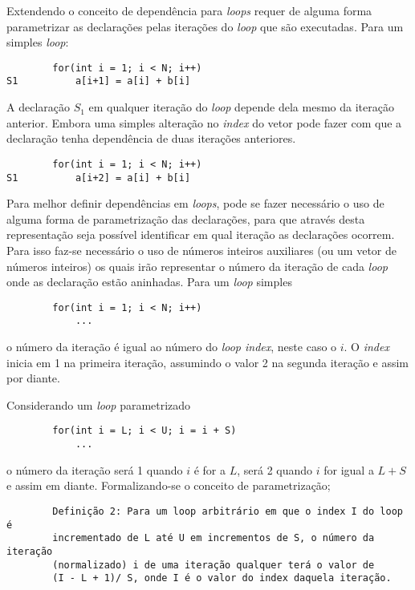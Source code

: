 Extendendo o conceito de dependência para \textit{loops} requer de alguma forma 
parametrizar as declarações pelas iterações do \textit{loop} que são
executadas.
Para um simples \textit{loop}:

\begin{verbatim}
        for(int i = 1; i < N; i++)
S1          a[i+1] = a[i] + b[i]
\end{verbatim}

A declaração $S_1$ em qualquer iteração do \textit{loop} depende dela mesmo da
iteração anterior. Embora uma simples alteração no \textit{index} do vetor pode
fazer com que a declaração tenha dependência de duas iterações anteriores.

\begin{verbatim}
        for(int i = 1; i < N; i++)
S1          a[i+2] = a[i] + b[i]
\end{verbatim}

Para melhor definir dependências em \textit{loops},  pode se fazer necessário o
uso de alguma forma de parametrização das declarações, para que através desta
representação seja possível identificar em qual iteração as declarações ocorrem.
Para isso faz-se necessário o uso de números inteiros auxiliares (ou um vetor de
números inteiros) os quais irão representar o número da iteração de cada 
\textit{loop} onde as declaração estão aninhadas.
Para um \textit{loop} simples

\begin{verbatim}
        for(int i = 1; i < N; i++)
            ...
\end{verbatim}

o número da iteração é igual ao número do \textit{loop index}, neste caso o $i$.
O \textit{index} inicia em 1 na primeira iteração, assumindo o valor 2 na
segunda iteração e assim por diante.

Considerando um \textit{loop} parametrizado

\begin{verbatim}
        for(int i = L; i < U; i = i + S)
            ...
\end{verbatim}

o número da iteração será 1 quando $i$ é for a $L$, será 2 quando $i$ for
igual a $L+S$ e assim em diante. 
Formalizando-se o conceito de parametrização;

\begin{verbatim}
        Definição 2: Para um loop arbitrário em que o index I do loop é
        incrementado de L até U em incrementos de S, o número da iteração
        (normalizado) i de uma iteração qualquer terá o valor de 
        (I - L + 1)/ S, onde I é o valor do index daquela iteração.
\end{verbatim}


